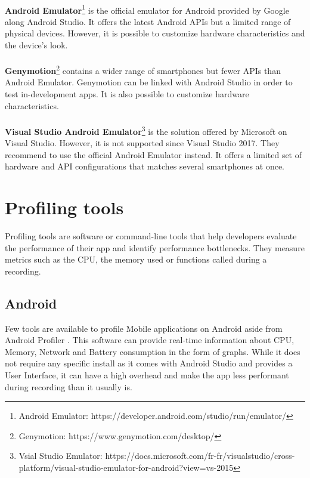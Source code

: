 \documentclass{kththesis}
\begin{document}
\paragraph{}
\textbf{Android Emulator}\footnote{Android Emulator: https://developer.android.com/studio/run/emulator/} is the official emulator for Android provided by Google along Android Studio. It offers the latest Android APIs but a limited range of physical devices. However, it is possible to customize hardware characteristics and the device's look.

\paragraph{}
\textbf{Genymotion}\footnote{Genymotion: https://www.genymotion.com/desktop/} contains a wider range of smartphones but fewer APIs than Android Emulator. Genymotion can be linked with Android Studio in order to test in-development apps. It is also possible to customize hardware characteristics.

\paragraph{}
\textbf{Visual Studio Android Emulator}\footnote{Vsial Studio Emulator: https://docs.microsoft.com/fr-fr/visualstudio/cross-platform/visual-studio-emulator-for-android?view=vs-2015} is the solution offered by Microsoft on Visual Studio. However, it is not supported since Visual Studio 2017. They recommend to use the official Android Emulator instead. It offers a limited set of hardware and API configurations that matches several smartphones at once. 

\section{Profiling tools}

Profiling tools are software or command-line tools that help developers evaluate the performance of their app and identify performance bottlenecks. They measure metrics such as the CPU, the memory used or functions called during a recording.

\subsection{Android}

Few tools are available to profile Mobile applications on Android aside from Android Profiler \cite{nanoscope}. This software can provide real-time information about CPU, Memory, Network and Battery consumption in the form of graphs. While it does not require any specific install as it comes with Android Studio and provides a User Interface, it can have a high overhead \cite{nanoscope} and make the app less performant during recording than it usually is. 
\end{document}
